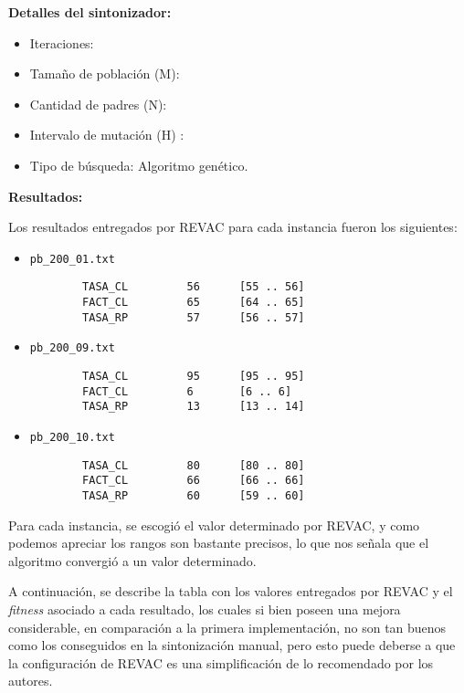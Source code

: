 \textbf{Detalles del sintonizador:}\\

\begin{itemize}
	\item Iteraciones: 
	\item Tamaño de población (M): 
	\item Cantidad de padres (N): 
	\item Intervalo de mutación (H) : 
	\item Tipo de búsqueda: Algoritmo genético.
\end{itemize}

\textbf{Resultados:}

Los resultados entregados por REVAC para cada instancia fueron los siguientes:

\begin{itemize}
	\item \texttt{pb\_200\_01.txt}\\

		\begin{verbatim}
		TASA_CL         56      [55 .. 56]
        FACT_CL         65      [64 .. 65]
        TASA_RP         57      [56 .. 57]
		\end{verbatim}
	\item \texttt{pb\_200\_09.txt}\\

		\begin{verbatim}
        TASA_CL         95      [95 .. 95]
        FACT_CL         6       [6 .. 6]
        TASA_RP         13      [13 .. 14]
		\end{verbatim}

	\item \texttt{pb\_200\_10.txt}\\

		\begin{verbatim}
        TASA_CL         80      [80 .. 80]
        FACT_CL         66      [66 .. 66]
        TASA_RP         60      [59 .. 60]
		\end{verbatim}

\end{itemize}

Para cada instancia, se escogió el valor determinado por REVAC,
y como podemos apreciar los rangos son bastante precisos, lo que nos señala
que el algoritmo convergió a un valor determinado.

A continuación, se describe la tabla con los valores entregados
por REVAC y el \emph{fitness} asociado a cada resultado, los cuales
si bien poseen una mejora considerable, en comparación a la primera implementación,
no son tan buenos como los conseguidos en la sintonización manual,
pero esto puede deberse a que la configuración de REVAC es una simplificación de
lo recomendado por los autores.

